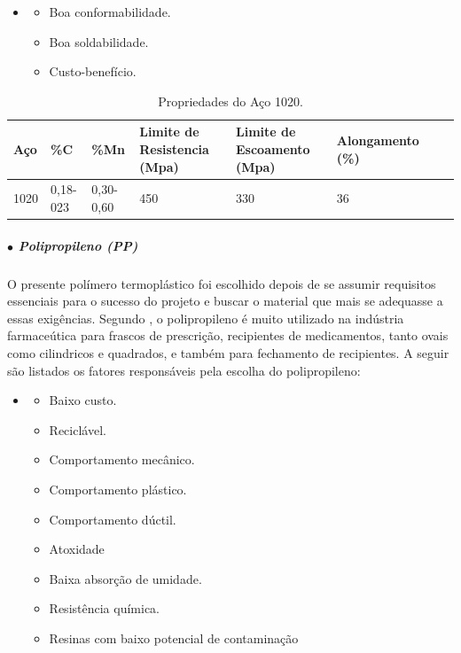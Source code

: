 \begin{itemize}
    \item []
    \begin{itemize}
        \item Boa conformabilidade.
        \item Boa soldabilidade.
        \item Custo-benefício.
    \end{itemize}
\end{itemize}

\begin{table}[H]
    \centering
    \caption{Propriedades do Aço 1020.}
    \label{fig:PropA1020}
    \begin{adjustbox}{max width = \textwidth}
        \begin{tabular}{|L{2cm}|C{2cm}|C{2cm}|C{2cm}|C{3cm}|C{3cm}|C{2.8cm}|C{2cm}|}
            \hline
            \textbf{Aço } & \textbf{\%C} & \textbf{\%Mn} & \textbf{Limite de Resistencia (Mpa)} & \textbf{Limite de Escoamento (Mpa)} & \textbf{Alongamento (\%)}\\ \hline
            
              1020 & 0,18-023 & 0,30-0,60 & 450  & 330 & 36
             \\ \hline
            
        \end{tabular}
    \end{adjustbox}
\end{table}
\subparagraph*{$\bullet$ Polipropileno (PP)} \hfill

O presente polímero termoplástico foi escolhido depois de se assumir requisitos essenciais para o sucesso do projeto e buscar o material que mais se adequasse a essas exigências. Segundo \cite{PP_Recycle}, o polipropileno é muito utilizado na indústria farmace{\'u}tica para frascos de prescriç{\~a}o, recipientes de medicamentos, tanto ovais como cilindricos e quadrados, e também para fechamento de recipientes. A seguir são listados os fatores responsáveis pela escolha do polipropileno: 

\begin{itemize}
    \item[ ]
    \begin{itemize}
        \item Baixo custo.
        \item Reciclável.
        \item Comportamento mecânico. 
        \item Comportamento plástico.
        \item Comportamento dúctil.
        \item Atoxidade
        \item Baixa absorção de umidade.
        \item Resistência química.
        \item Resinas com baixo potencial de contaminação
    \end{itemize}
\end{itemize}

